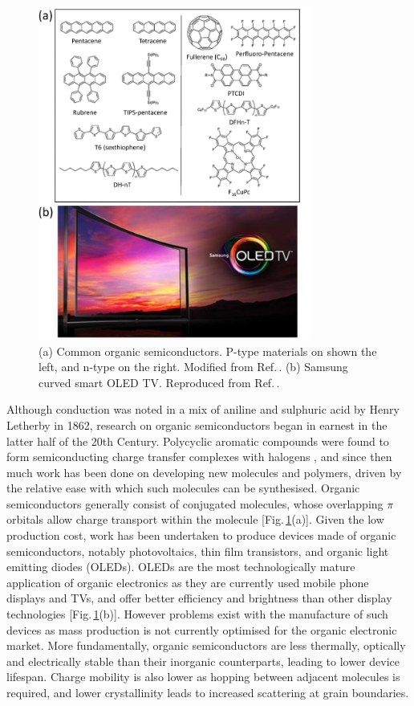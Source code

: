 \begin{figure}[h!]
\centering
\includegraphics[width=0.8\textwidth]{Fig2}
\caption{(a) Common organic semiconductors. P-type materials on shown the left, and n-type on the right. Modified from Ref.\,\cite{Miozzo2010}. (b) Samsung curved smart OLED TV. Reproduced from Ref.\,\cite{Samsung}.}
\label{1Fig2}
\end{figure}
Although conduction was noted in a mix of aniline and sulphuric acid by Henry Letherby in 1862, research on organic semiconductors began in earnest in the latter half of the 20th Century. Polycyclic aromatic compounds were found to form semiconducting charge transfer complexes with halogens \cite{Naarmann2002}, and since then much work has been done on developing new molecules and polymers, driven by the relative ease with which such molecules can be synthesised. Organic semiconductors generally consist of conjugated molecules, whose overlapping $\pi$ orbitals allow charge transport within the molecule [Fig.\,\ref{1Fig2}(a)]. Given the low production cost, work has been undertaken to produce devices made of organic semiconductors, notably photovoltaics, thin film transistors, and organic light emitting diodes (OLEDs). OLEDs are the most technologically mature application of organic electronics as they are currently used mobile phone displays and TVs, and offer better efficiency and brightness than other display technologies [Fig.\,\ref{1Fig2}(b)]. However problems exist with the manufacture of such devices as mass production is not currently optimised for the organic electronic market. More fundamentally, organic semiconductors are less thermally, optically and electrically stable than their inorganic counterparts, leading to lower device lifespan. Charge mobility is also lower as hopping between adjacent molecules is required, and lower crystallinity leads to increased scattering at grain boundaries. 

